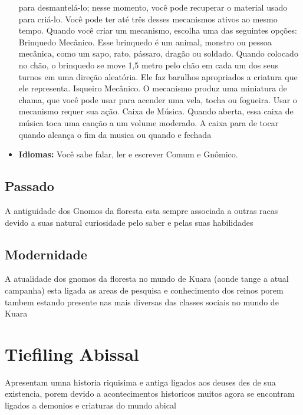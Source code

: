 \documentclass{book}
\begin{document}
\begin{itemize}
          para desmantelá-lo; nesse momento, você pode recuperar o material usado para 
          criá-lo. Você pode ter até três desses mecanismos ativos ao mesmo tempo.
          Quando você criar um mecanismo, escolha uma das seguintes opções:
          Brinquedo Mecânico. Esse brinquedo é um animal, monstro ou pessoa mecânica, 
          como um sapo, rato, pássaro, dragão ou soldado. Quando colocado no chão,
          o brinquedo se move 1,5 metro pelo chão em cada um dos seus turnos em uma direção
         aleatória. Ele faz barulhos apropriados a criatura que ele representa.
         Isqueiro Mecânico. O mecanismo produz uma miniatura de chama, que você pode usar 
         para acender uma vela, tocha ou fogueira. Usar o mecanismo requer sua ação.
         Caixa de Música. Quando aberta, essa caixa de música toca uma canção a um volume
         moderado. A caixa para de tocar quando alcança o fim da musica ou quando e fechada
    \item \textbf{Idiomas:} Você sabe falar, ler e escrever Comum e Gnômico.

\end{itemize}
\section{Passado}
A antiguidade dos Gnomos da floresta esta sempre associada a outras racas devido a suas 
natural curiosidade pelo saber e pelas suas habilidades 
\section{Modernidade}
A atualidade dos gnomos da floresta no mundo de Kuara (aonde tange a atual campanha) esta
ligada as areas de pesquisa e conhecimento dos reinos porem tambem estando presente nas 
mais diversas das classes sociais no mundo de Kuara 

\chapter{Tiefiling Abissal}
Apresentam umna historia riquisima e antiga ligados aos deuses des de sua existencia, porem 
devido a acontecimentos historicos muitos agora se encontram ligados a demonios e criaturas 
do mundo abical 
\end{document}
